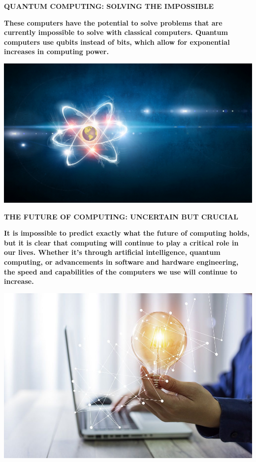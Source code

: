 \documentclass[pdf,aspectratio=169]{beamer}
\begin{document}
\begin{frame}{\textbf{QUANTUM COMPUTING: SOLVING THE IMPOSSIBLE}}
	\begin{minipage}{0.6\textwidth}
		\textbf{\text These computers have the potential to solve problems that are currently impossible to solve with classical computers. Quantum computers use qubits instead of bits, which allow for exponential increases in computing power.}
	\end{minipage}
	\hfill
	\begin{minipage}{0.3\textwidth}
		\centering
		\includegraphics[width=\textwidth]{figs/IMG8}
	\end{minipage}
\end{frame}

\begin{frame}{\textbf{THE FUTURE OF COMPUTING: UNCERTAIN BUT CRUCIAL}}
	\begin{minipage}{0.6\textwidth}
		\textbf{\text It is impossible to predict exactly what the future of computing holds, but it is clear that computing will continue to play a critical role in our lives. Whether it's through artificial intelligence, quantum computing, or advancements in software and hardware engineering, the speed and capabilities of the computers we use will continue to increase.}
	\end{minipage}
	\hfill
	\begin{minipage}{0.3\textwidth}
		\centering
		\includegraphics[width=\textwidth]{figs/IMG9}
	\end{minipage}
\end{frame}
\end{document}
